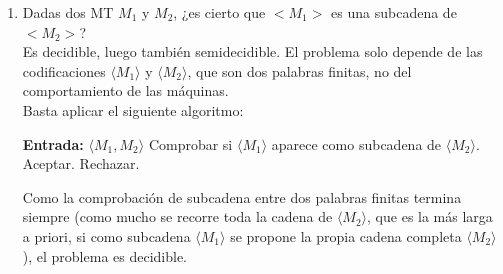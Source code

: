 \documentclass[12pt]{article}
\begin{document}
\begin{ejercicio}[2 puntos]
\begin{enumerate}
            Esta construcción es válida porque los programas Post--Turing son equivalentes a las MT.

            Entonces:
            \begin{itemize}
                \item si $\langle M\rangle \in \text{DIAGONAL}$, entonces $M$ no acepta $\langle M\rangle$, y por construcción $P_M$ no acepta ninguna palabra; en particular, no acepta $\varepsilon$.
                \item Si $\langle M\rangle \notin \text{DIAGONAL}$, entonces $M$ acepta $\langle M\rangle$, y por construcción $P_M$ acepta todas las palabras; en particular, acepta $\varepsilon$.
            \end{itemize}

            Por tanto,
            $$
            \langle M\rangle \in \text{DIAGONAL}(M)
            \Longleftrightarrow
            \langle P_M\rangle \in \text{NOACEPTA}_{\varepsilon}(P_M).
            $$

            Como $\text{DIAGONAL} \propto \text{NOACEPTA}_\varepsilon$ y DIAGONAL no es semidecidible, $\text{NOACEPTA}_{\varepsilon}$ tampoco es semidecidible. En particular, no es decidible.

            \newpage

            \item Dadas dos MT $M_1$ y $M_2$, ¿es cierto que $<M_1>$ es una subcadena de $<M_2>$? \\
            
            Es decidible, luego también semidecidible. El problema solo depende de las codificaciones $\langle M_1\rangle$ y
            $\langle M_2\rangle$, que son dos palabras finitas, no del comportamiento de las máquinas. \\

            Basta aplicar el siguiente algoritmo:

            \begin{algorithm}
            \caption{$M_{P_4}$}
            \begin{algorithmic}
            \State \textbf{Entrada:} $\langle M_1,M_2\rangle$
            \State Comprobar si $\langle M_1\rangle$ aparece como subcadena de $\langle M_2\rangle$.
                \State Aceptar.
            \Else
                \State Rechazar.
            \EndIf
            \end{algorithmic}
            \end{algorithm}

            Como la comprobación de subcadena entre dos palabras finitas termina siempre (como mucho se recorre toda
            la cadena de $\langle M_2 \rangle$, que es la más larga a priori, si como subcadena $\langle M_1 \rangle$ 
            se propone la propia cadena completa $\langle M_2 \rangle$), el problema es decidible.
        \end{enumerate}
    \end{ejercicio}
\end{document}
